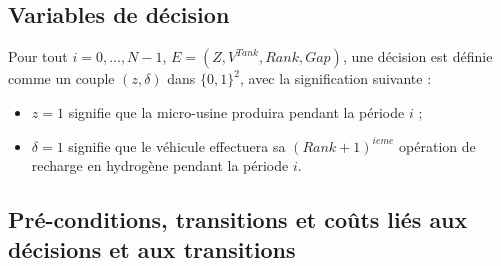 \subsection{Variables de décision}

Pour tout $i = 0, \dots, N-1$, $E = (Z, V^{Tank}, Rank, Gap)$, une décision est définie comme un couple $(z, \delta )$ dans $\{0,1\}^2$, avec la signification suivante :
\begin{itemize}[label=$\square$]
	\item $z = 1$ signifie que la micro-usine produira pendant la période $i$ ;
	\item $\delta= 1$ signifie que le véhicule effectuera sa $(Rank+1)^{ieme}$ opération de recharge en hydrogène pendant la période $i$.
\end{itemize} 
\subsection{Pré-conditions, transitions et coûts liés aux décisions et aux transitions}

